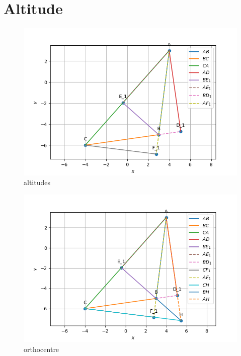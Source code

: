 \documentclass[book,11pt]{IEEEtran}
\begin{document}
\section{Altitude}

\begin{figure}[H]
\includegraphics[width=\columnwidth]{figs/main18.png}
\caption{altitudes}
\label{fig:i_triangle_py}
\end{figure}
\begin{figure}[H]
\includegraphics[width=\columnwidth]{figs/main17.png}
\caption{orthocentre}
\label{fig:i_triangle_py}
\end{figure}
\end{document}
